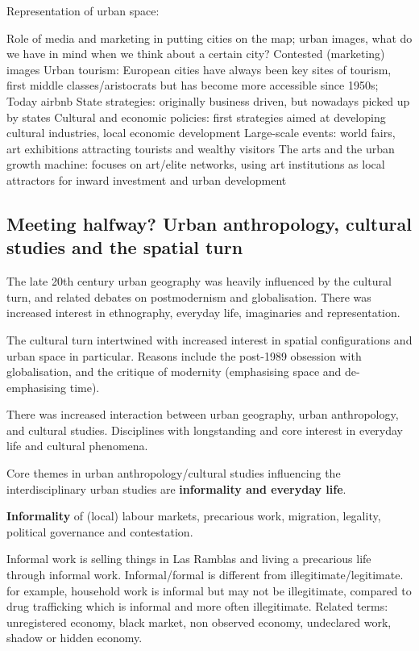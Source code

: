 \documentclass{article}
\begin{document}
Representation of urban space:

\begin{outline}
	\1 Role of media and marketing in putting cities on the map; urban images, what do we have in mind when we think about a certain city?
	\1 Contested (marketing) images
	\1 Urban tourism: European cities have always been key sites of tourism, first middle classes/aristocrats but has become more accessible since 1950s; Today airbnb
	\1 State strategies: originally business driven, but nowadays picked up by states
		\2 Cultural and economic policies: first strategies aimed at developing cultural industries, local economic development
		\2 Large-scale events: world fairs, art exhibitions attracting tourists and wealthy visitors
		\2 The arts and the urban growth machine: focuses on art/elite networks, using art institutions as local attractors for inward investment and urban development
\end{outline}

\subsection{Meeting halfway? Urban anthropology, cultural studies and the spatial turn}

The late 20th century urban geography was heavily influenced by the cultural turn, and related debates on postmodernism and globalisation. There was increased interest in ethnography, everyday life, imaginaries and representation.

The cultural turn intertwined with increased interest in spatial configurations and urban space in particular. Reasons include the post-1989 obsession with globalisation, and the critique of modernity (emphasising space and de-emphasising time).

There was increased interaction between urban geography, urban anthropology, and cultural studies. Disciplines with longstanding and core interest in everyday life and cultural phenomena.

Core themes in urban anthropology/cultural studies influencing the interdisciplinary urban studies are \textbf{informality and everyday life}.

\textbf{Informality} of (local) labour markets, precarious work, migration, legality, political governance and contestation. 

Informal work is selling things in Las Ramblas and living a precarious life through informal work. Informal/formal is different from illegitimate/legitimate. for example, household work is informal but may not be illegitimate, compared to drug trafficking which is informal and more often illegitimate. 
Related terms: unregistered economy, black market, non observed economy, undeclared work, shadow or hidden economy.
\end{document}
